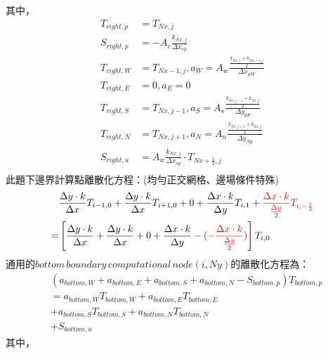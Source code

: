 \documentclass[12pt]{article}
\begin{document}
\noindent 其中，
\begin{equation}
    \begin{split}
        T_{right,p} &= T_{Nx,j} \\
        S_{right,p} &= -A_{e}\frac{k_{Nx,j}}{\Delta x_{ep}}\\
        T_{right,W} &= T_{Nx-1,j}, a_{W} = A_{w}\frac{\frac{k_{Nx,j}+k_{Nx-1,j}}{2}}{\Delta x_{pW}}\\
        T_{right,E} &= 0 , a_{E} = 0\\
        T_{right,S} &= T_{Nx,j-1}, a_{S} = A_{s}\frac{\frac{k_{Nx,j-1}+k_{Nx,j}}{2}}{\Delta y_{pS}}\\
        T_{right,N} &= T_{Nx,j+1} ,a_{N} = A_{n}\frac{\frac{k_{Nx,j+1}+k_{Nx,j}}{2}}{\Delta y_{Np}}\\
        S_{right,u} &=A_{w}\frac{k_{Nx,j}}{\Delta x_{ep}}\cdot T_{Nx+\frac{1}{2},j}\\
    \end{split}
\end{equation}
\noindent 此題下邊界計算點離散化方程：(均勻正交網格、邊場條件特殊)\\
\begin{equation}
    \begin{split}
 &\frac{\Delta y   \cdot k}{\Delta x}T_{i-1,0}+  \frac{\Delta y \cdot k}{\Delta x}T_{i+1,0}+
 0 + \frac{\Delta x \cdot k}{\Delta y}T_{i,1} + {\color{red}\frac{\Delta x\cdot k }{\frac{\Delta y}{2}}T_{i,-\frac{1}{2}}}\\
=&\left[\frac{\Delta y   \cdot k }{\Delta x}+ \frac{\Delta y \cdot k }{\Delta x} + 0 + \frac{\Delta x   \cdot k }{\Delta y}- {\color{red}(-\frac{\Delta x\cdot k }{\frac{\Delta y}{2}})} \right]T_{i,0} \\
\end{split}
\end{equation}
\noindent 通用的$bottom\,boundary\,computational\,node (i,Ny)$的離散化方程為：\\
\begin{equation}
\begin{split}
    &(a_{bottom,W}+a_{bottom,E}+a_{bottom,S}+a_{bottom,N}-S_{bottom,p})T_{bottom,p}\\
    &= a_{bottom,W}T_{bottom,W} + a_{bottom,E}T_{bottom,E} \\
    & +  a_{bottom,S}T_{bottom,S} + a_{bottom,N}T_{bottom,N} \\
    & + S_{bottom,u}
\end{split}
\end{equation}
\noindent 其中，
\end{document}
